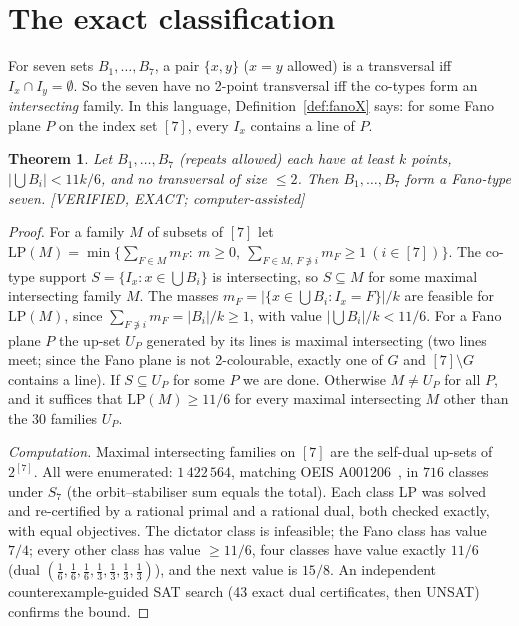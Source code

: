 \documentclass[11pt]{article}
\newtheorem{theorem}{Theorem}[section]
\theoremstyle{definition}
\newcommand{\st}[1]{\textsf{\small[#1]}}
\begin{document}
\section{The exact classification}\label{sec:class}

For seven sets $B_1,\dots,B_7$, a pair $\{x,y\}$ ($x=y$ allowed) is a transversal iff $I_x\cap I_y=\emptyset$. So the
seven have no 2-point transversal iff the co-types form an \emph{intersecting} family. In this language,
Definition~\ref{def:fanoX} says: for some Fano plane $P$ on the index set $[7]$, every $I_x$ contains a line of $P$.

\begin{theorem}\label{thm:class}
Let $B_1,\dots,B_7$ (repeats allowed) each have at least $k$ points, $|\bigcup B_i|<11k/6$, and no transversal of
size $\le2$. Then $B_1,\dots,B_7$ form a Fano-type seven. \st{VERIFIED, EXACT; computer-assisted}
\end{theorem}
\begin{proof}
For a family $M$ of subsets of $[7]$ let
$\mathrm{LP}(M)=\min\{\sum_{F\in M}m_F:\ m\ge0,\ \sum_{F\in M,\,F\not\ni i}m_F\ge1\ (i\in[7])\}$.
The co-type support $S=\{I_x:x\in\bigcup B_i\}$ is intersecting, so $S\subseteq M$ for some maximal intersecting family
$M$. The masses $m_F=|\{x\in\bigcup B_i:I_x=F\}|/k$ are feasible for $\mathrm{LP}(M)$, since
$\sum_{F\not\ni i}m_F=|B_i|/k\ge1$, with value $|\bigcup B_i|/k<11/6$. For a Fano plane $P$ the up-set $U_P$ generated
by its lines is maximal intersecting (two lines meet; since the Fano plane is not 2-colourable, exactly one of $G$ and
$[7]\setminus G$ contains a line). If $S\subseteq U_P$ for some $P$ we are done. Otherwise $M\ne U_P$ for all $P$,
and it suffices that $\mathrm{LP}(M)\ge11/6$ for every maximal intersecting $M$ other than the $30$ families $U_P$.

\emph{Computation.} Maximal intersecting families on $[7]$ are the self-dual up-sets of $2^{[7]}$. All were
enumerated: $1\,422\,564$, matching OEIS A001206~\cite{OEIS}, in $716$ classes under $S_7$ (the orbit--stabiliser sum
equals the total). Each class LP was solved and re-certified by a rational primal and a rational dual, both checked
exactly, with equal objectives. The dictator class is infeasible; the Fano class has value $7/4$; every other class
has value $\ge11/6$, four classes have value exactly $11/6$ (dual
$(\tfrac16,\tfrac16,\tfrac16,\tfrac13,\tfrac13,\tfrac13,\tfrac13)$), and the next value is $15/8$. An independent
counterexample-guided SAT search (43 exact dual certificates, then UNSAT) confirms the bound.
\end{proof}
\end{document}
